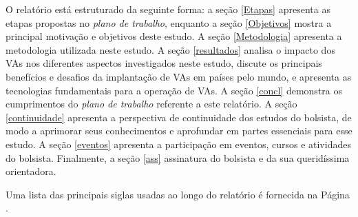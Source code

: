 \documentclass[
	12pt,				%
	openany, %
	a4paper,			%
	english,			%
	french,				%
	spanish,			%
	brazil				%
	]{abntex2}
\begin{document}
O relatório está estruturado da seguinte forma: a seção \ref{Etapas} apresenta as etapas propostas no \textit{plano de trabalho}, enquanto a seção \ref{Objetivos} mostra a principal motivação e objetivos deste estudo. A seção \ref{Metodologia} apresenta a metodologia utilizada neste estudo. A seção \ref{resultados} analisa o impacto dos VAs nos diferentes aspectos investigados neste estudo, discute os principais benefícios e desafios da implantação de VAs em países pelo mundo, e apresenta as tecnologias fundamentais para a operação de VAs. A seção \ref{concl} demonstra os cumprimentos do \textit{plano de trabalho} referente a este relatório. A seção \ref{continuidade} apresenta a perspectiva de continuidade dos estudos do bolsista, de modo a aprimorar seus conhecimentos e aprofundar em partes essenciais para esse estudo. A seção \ref{eventos} apresenta a participação em eventos, cursos e atividades do bolsista. Finalmente, a seção \ref{ass} assinatura do bolsista e da sua queridíssima orientadora.

Uma lista das principais siglas usadas ao longo do relatório é fornecida na Página \pageref{eq:1}.





%









\end{document}
